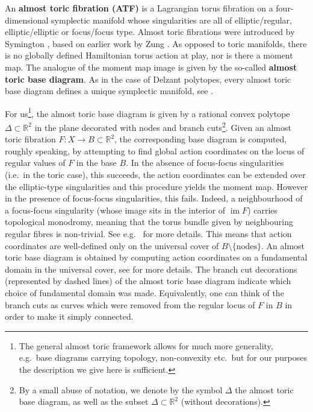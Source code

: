 \documentclass[12pt,a4paper,draft]{scrartcl}
\DeclareMathOperator{\im}{im}
\begin{document}
An \textbf{almost toric fibration (ATF)} is a Lagrangian torus fibration on a four-dimensional symplectic manifold whose singularities are all of elliptic\-/regular, elliptic\-/elliptic or focus\-/focus type.
Almost toric fibrations were introduced by Sy\-ming\-ton \cite{symington2002FourDF}, based on earlier work by Zung \cite{Zun96,Zun97,Zun03}.
As opposed to toric manifolds, there is no globally defined Hamiltonian torus action at play, nor is there a moment map.
The analogue of the moment map image is given by the so-called \textbf{almost toric base diagram}.
As in the case of Delzant polytopes, every almost toric base diagram defines a unique symplectic manifold, see \cite[Corollary 5.4]{symington2002FourDF} \cite[Theorem 8.5]{evans2021atfs}. 

For us\footnote{The general almost toric framework allows for much more generality, e.g.\ base diagrams carrying topology, non-convexity etc.\ but for our purposes the description we give here is sufficient.}, the almost toric base diagram is given by a rational convex polytope $\Delta \subset \mathbb{R}^2$ in the plane decorated with nodes and branch cuts\footnote{By a small abuse of notation, we denote by the symbol $\Delta$ the almost toric base diagram, as well as the subset $\Delta \subset \mathbb{R}^2$ (without decorations).}.
Given an almost toric fibration $F \colon X \rightarrow B \subset \mathbb{R}^2$, the corresponding base diagram is computed, roughly speaking, by attempting to find global action coordinates on the locus of regular values of $F$ in the base $B$.
In the absence of focus-focus singularities (i.e.\ in the toric case), this succeeds, the action coordinates can be extended over the elliptic-type singularities and this procedure yields the moment map.
However in the presence of focus-focus singularities, this fails.
Indeed, a neighbourhood of a focus-focus singularity (whose image sits in the interior of $\im F$) carries topological monodromy, meaning that the torus bundle given by neighbouring regular fibres is non-trivial.
See e.g.\ \cite{Zun97} for more details.
This means that action coordinates are well-defined only on the universal cover of $B \setminus \{\text{nodes}\}$.
An almost toric base diagram is obtained by computing action coordinates on a fundamental domain in the universal cover, see \cite[Definition 8.3]{evans2021atfs} for more details.
The branch cut decorations (represented by dashed lines) of the almost toric base diagram indicate which choice of fundamental domain was made.
Equivalently, one can think of the branch cuts as curves which were removed from the regular locus of $F$ in $B$ in order to make it simply connected.
\end{document}
